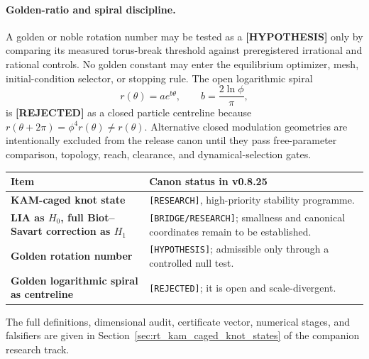 \documentclass[11pt]{article}
\theoremstyle{definition}
\theoremstyle{plain}
\theoremstyle{remark}
\begin{document}
        \paragraph{Golden-ratio and spiral discipline.}
        A golden or noble rotation number may be tested as a
        \textbf{[HYPOTHESIS]} only by comparing its measured torus-break threshold
        against preregistered irrational and rational controls.  No golden
        constant may enter the equilibrium optimizer, mesh, initial-condition
        selector, or stopping rule.  The open logarithmic spiral
        \begin{equation}
            r(\theta)=a e^{b\theta},
            \qquad
            b=\frac{2\ln\phi}{\pi},
            \label{eq:canon_golden_log_spiral_rejected}
        \end{equation}
        is \textbf{[REJECTED]} as a closed particle centreline because
        \(r(\theta+2\pi)=\phi^4r(\theta)\neq r(\theta)\).  Alternative closed
        modulation geometries are intentionally excluded from the release
        canon until they pass free-parameter comparison, topology, reach,
        clearance, and dynamical-selection gates.

        \begin{center}
        \begin{tabularx}{0.94\textwidth}{@{}>{\bfseries}p{}X@{}}
        \toprule
        Item & Canon status in v0.8.25 \\
        \midrule
        KAM-caged knot state & \texttt{[RESEARCH]}, high-priority stability programme. \\
        LIA as \(H_0\), full Biot--Savart correction as \(H_1\) & \texttt{[BRIDGE/RESEARCH]}; smallness and canonical coordinates remain to be established. \\
        Golden rotation number & \texttt{[HYPOTHESIS]}; admissible only through a controlled null test. \\
        Golden logarithmic spiral as centreline & \texttt{[REJECTED]}; it is open and scale-divergent. \\
        \bottomrule
        \end{tabularx}
        \end{center}

        The full definitions, dimensional audit, certificate vector, numerical
        stages, and falsifiers are given in
        Section~\ref{sec:rt_kam_caged_knot_states} of the companion research
        track.
\end{document}
